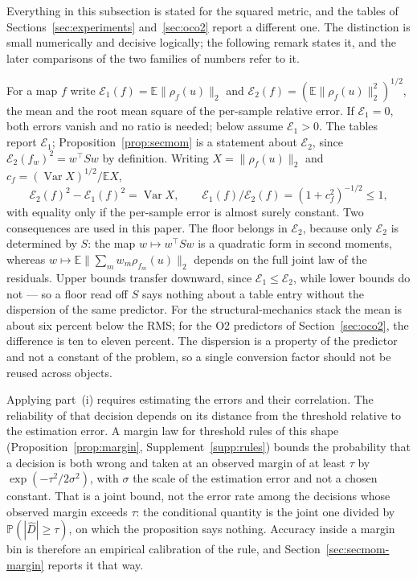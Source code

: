 Everything in this subsection is stated for the squared metric, and the tables
of Sections~\ref{sec:experiments} and~\ref{sec:oco2} report a different one.
The distinction is small numerically and decisive logically; the following
remark states it, and the later comparisons of the two families of numbers
refer to it.

\begin{remark}\label{rem:metric}
For a map $f$ write
$\mathcal E_1(f)=\mathbb E\|\rho_f(u)\|_2$ and
$\mathcal E_2(f)=(\mathbb E\|\rho_f(u)\|_2^2)^{1/2}$, the mean and the root
mean square of the per-sample relative error. If $\mathcal E_1=0$, both errors vanish and no ratio is needed; below assume $\mathcal E_1>0$. The tables report
$\mathcal E_1$; Proposition~\ref{prop:secmom} is a statement about
$\mathcal E_2$, since $\mathcal E_2(f_w)^2=w^\top Sw$ by definition. Writing
$X=\|\rho_f(u)\|_2$ and $c_f=(\operatorname{Var}X)^{1/2}/\mathbb EX$,
\[
\mathcal E_2(f)^2-\mathcal E_1(f)^2=\operatorname{Var}X,
\qquad
\mathcal E_1(f)/\mathcal E_2(f)=(1+c_f^2)^{-1/2}\le1 ,
\]
with equality only if the per-sample error is almost surely constant. Two
consequences are used in this paper. The floor belongs in $\mathcal E_2$,
because only $\mathcal E_2$ is determined by $S$: the map
$w\mapsto w^\top Sw$ is a quadratic form in second moments, whereas
$w\mapsto\mathbb E\|\sum_m w_m\rho_{f_m}(u)\|_2$ depends on the full joint law
of the residuals. Upper bounds transfer downward, since
$\mathcal E_1\le\mathcal E_2$, while lower bounds do not --- so a floor read
off $S$ says nothing about a table entry without the dispersion of the same
predictor. For the structural-mechanics stack the mean is about six percent
below the RMS; for the O2 predictors of Section~\ref{sec:oco2}, the difference
is ten to eleven percent. The dispersion is a property of the predictor and not
a constant of the problem, so a single conversion factor should not be reused
across objects.
\end{remark}

Applying part~(i) requires estimating the errors and their correlation.
The reliability of that decision depends on its distance from the threshold
relative to the estimation error. A margin law for threshold rules of this shape
(Proposition~\ref{prop:margin}, Supplement~\ref{supp:rules}) bounds the
probability that a decision is both wrong and taken at an observed margin
of at least $\tau$ by $\exp(-\tau^{2}/2\sigma^{2})$, with $\sigma$ the
scale of the estimation error and not a chosen constant. That is a joint
bound, not the error rate among the decisions whose observed margin
exceeds $\tau$: the conditional quantity is the joint one divided by
$\mathbb P(|\widehat D|\ge\tau)$, on which the proposition says nothing.
Accuracy inside a margin bin is therefore an empirical calibration of the
rule, and Section~\ref{sec:secmom-margin} reports it that way.

